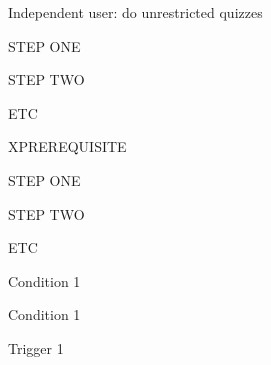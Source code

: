 

\begin{uc}{Independent user: do unrestricted quizzes}

    \begin{uc-mss}
    \item STEP ONE
    \item STEP TWO
    \item ETC
    \end{uc-mss}

    \begin{uc-ext}

        \begin{uc-fail}{X}{PREREQUISITE}
        \item STEP ONE
        \item STEP TWO
        \item ETC
        \end{uc-fail}

    \end{uc-ext}

    \begin{uc-pre}
    \item Condition 1
    \end{uc-pre}

    \begin{uc-post}
    \item Condition 1
    \end{uc-post}

    \begin{uc-trig}
    \item Trigger 1
    \end{uc-trig}

\end{uc}